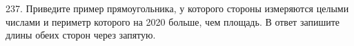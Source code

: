 237. Приведите пример прямоугольника, у которого стороны измеряются целыми числами и периметр которого на 2020 больше, чем площадь. В ответ запишите длины обеих сторон через запятую.\\
